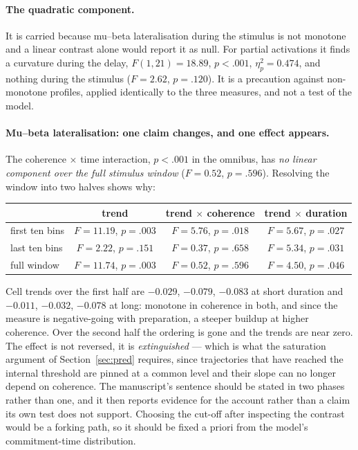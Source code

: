 \documentclass[a4paper,11pt]{article}
\newcommand{\1}{\mathbbm{1}}
\begin{document}
\paragraph{The quadratic component.} It is carried because mu--beta lateralisation
during the stimulus is not monotone and a linear contrast alone would report it as null.
For partial activations it finds a curvature during the delay, $F(1,21)=18.89$, $p<.001$,
$\eta_p^2=0.474$, and nothing during the stimulus ($F=2.62$, $p=.120$). It is a
precaution against non-monotone profiles, applied identically to the three measures, and
not a test of the model.

\paragraph{Mu--beta lateralisation: one claim changes, and one effect appears.}
The coherence $\times$ time interaction, $p<.001$ in the omnibus, has \emph{no linear
component over the full stimulus window} ($F=0.52$, $p=.596$). Resolving the window into
two halves shows why:

\begin{center}
\begin{tabular}{lccc}
\toprule
& trend & trend $\times$ coherence & trend $\times$ duration\\
\midrule
first ten bins & $F=11.19$, $p=.003$ & $F=5.76$, $p=.018$ & $F=5.67$, $p=.027$\\
last ten bins & $F=2.22$, $p=.151$ & $F=0.37$, $p=.658$ & $F=5.34$, $p=.031$\\
full window & $F=11.74$, $p=.003$ & $F=0.52$, $p=.596$ & $F=4.50$, $p=.046$\\
\bottomrule
\end{tabular}
\end{center}

\noindent Cell trends over the first half are $-0.029$, $-0.079$, $-0.083$ at short
duration and $-0.011$, $-0.032$, $-0.078$ at long: monotone in coherence in both, and
since the measure is negative-going with preparation, a steeper buildup at higher
coherence. Over the second half the ordering is gone and the trends are near zero. The
effect is not reversed, it is \emph{extinguished} --- which is what
the saturation argument of Section~\ref{sec:pred} requires, since trajectories that have reached the internal
threshold are pinned at a common level and their slope can no longer depend on
coherence. The manuscript's sentence should be stated in two phases rather than one,
and it then reports evidence for the account rather than a claim its own test does not
support. Choosing the cut-off after inspecting the contrast would be a forking path, so
it should be fixed a priori from the model's commitment-time distribution.
\end{document}
